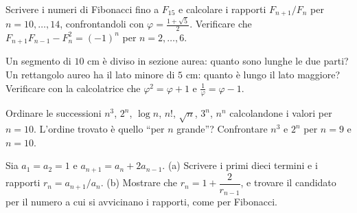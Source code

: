 \begin{esercizio}[\liv{2}]
Scrivere i numeri di Fibonacci fino a $F_{15}$ e calcolare i rapporti $F_{n+1}/F_n$ per $n=10,\dots,14$, confrontandoli con $\varphi=\frac{1+\sqrt5}2$. Verificare che $F_{n+1}F_{n-1}-F_n^2=(-1)^n$ per $n=2,\dots,6$.
\end{esercizio}

\begin{esercizio}[\liv{2}]
Un segmento di $10$ cm è diviso in sezione aurea: quanto sono lunghe le due parti? Un rettangolo aureo ha il lato minore di $5$ cm: quanto è lungo il lato maggiore? Verificare con la calcolatrice che $\varphi^2=\varphi+1$ e $\frac1\varphi=\varphi-1$.
\end{esercizio}

\begin{esercizio}[\liv{2}]
Ordinare le successioni $n^3$, $2^n$, $\log n$, $n!$, $\sqrt n$, $3^n$, $n^n$ calcolandone i valori per $n=10$. L'ordine trovato è quello ``per $n$ grande''? Confrontare $n^3$ e $2^n$ per $n=9$ e $n=10$.
\end{esercizio}

\begin{esercizio}[\liv{3}]
Sia $a_1=a_2=1$ e $a_{n+1}=a_n+2a_{n-1}$. (a) Scrivere i primi dieci termini e i rapporti $r_n=a_{n+1}/a_n$. (b) Mostrare che $r_n=1+\dfrac2{r_{n-1}}$, e trovare il candidato per il numero a cui si avvicinano i rapporti, come per Fibonacci.
\end{esercizio}


